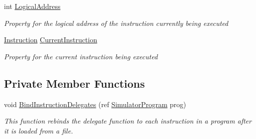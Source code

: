 \begin{DoxyCompactItemize}
int \hyperlink{class_c_p_u___o_s___simulator_1_1_c_p_u_1_1_execution_unit_ac939e9a08b30b2cc3a9438d6c1cc5a61}{Logical\+Address}
\begin{DoxyCompactList}\small\item\em Property for the logical address of the instruction currently being executed \end{DoxyCompactList}\item 
\hyperlink{class_c_p_u___o_s___simulator_1_1_c_p_u_1_1_instruction}{Instruction} \hyperlink{class_c_p_u___o_s___simulator_1_1_c_p_u_1_1_execution_unit_a285d7b487a3ac5eff07c640e438ceb11}{Current\+Instruction}
\begin{DoxyCompactList}\small\item\em Property for the current instruction being executed \end{DoxyCompactList}\end{DoxyCompactItemize}
\subsection*{Private Member Functions}
\begin{DoxyCompactItemize}
\item 
void \hyperlink{class_c_p_u___o_s___simulator_1_1_c_p_u_1_1_execution_unit_a347b4e0a7be75b81c0c226c620f56652}{Bind\+Instruction\+Delegates} (ref \hyperlink{class_c_p_u___o_s___simulator_1_1_c_p_u_1_1_simulator_program}{Simulator\+Program} prog)
\begin{DoxyCompactList}\small\item\em This function rebinds the delegate function to each instruction in a program after it is loaded from a file. \end{DoxyCompactList}\end{DoxyCompactItemize}
